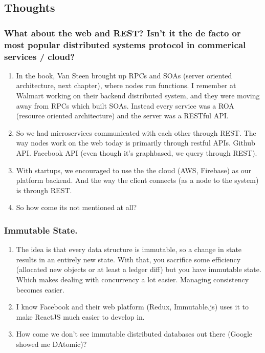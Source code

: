 \documentclass[11pt]{article}
\begin{document}
\subsection{Thoughts}
\label{sec-1-2}
\subsubsection{What about the web and REST?  Isn't it the de facto or most popular distributed systems protocol in commerical services / cloud?}
\label{sec-1-2-1}
\begin{enumerate}
\item In the book, Van Steen brought up RPCs and SOAs (server oriented architecture, next chapter), where nodes run functions.  I remember at Walmart working on their backend distributed system, and they were moving away from RPCs which built SOAs.  Instead every service was a ROA (resource oriented architecture) and the server was a RESTful API.
\label{sec-1-2-1-1}
\item So we had microservices communicated with each other through REST.  The way nodes work on the web today is primarily through restful APIs.  Github API.  Facebook API (even though it's graphbased, we query through REST).
\label{sec-1-2-1-2}
\item With startups, we encouraged to use the the cloud (AWS, Firebase) as our platform backend.  And the way the client connects (as a node to the system) is through REST.
\label{sec-1-2-1-3}
\item So how come its not mentioned at all?
\label{sec-1-2-1-4}
\end{enumerate}
\subsubsection{Immutable State.}
\label{sec-1-2-2}
\begin{enumerate}
\item The idea is that every data structure is immutable, so a change in state results in an entirely new state.  With that, you sacrifice some efficiency (allocated new objects or at least a ledger diff) but you have immutable state.  Which makes dealing with concurrency a lot easier.  Managing consistency becomes easier.
\label{sec-1-2-2-1}
\item I know Facebook and their web platform (Redux, Immutable.js) uses it to make ReactJS much easier to develop in.
\label{sec-1-2-2-2}
\item How come we don't see immutable distributed databases out there (Google showed me DAtomic)?
\label{sec-1-2-2-3}
\end{enumerate}
\end{document}
